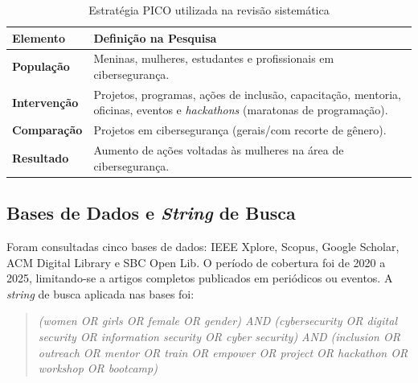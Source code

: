 \documentclass[12pt]{article}
\begin{document}
\begin{table}[H]
\centering
\caption{Estratégia PICO utilizada na revisão sistemática}
\label{tab:pico}
\begin{tabular}{|l|p{9.5cm}|}
    \hline
    \textbf{Elemento} & \textbf{Definição na Pesquisa} \\
    \hline
    \textbf{População} & Meninas, mulheres, estudantes e profissionais em cibersegurança. \\
    \hline
    \textbf{Intervenção} & Projetos, programas, ações de inclusão, capacitação, mentoria, oficinas, eventos e \textit{hackathons} (maratonas de programação). \\
    \hline
    \textbf{Comparação} & Projetos em cibersegurança (gerais/com recorte de gênero). \\
    \hline
    \textbf{Resultado} & Aumento de ações voltadas às mulheres na área de cibersegurança. \\
    \hline
\end{tabular}
\end{table}

\subsection{Bases de Dados e \textit{String} de Busca}\label{subsec:bases}

Foram consultadas cinco bases de dados: IEEE Xplore, Scopus, Google Scholar, ACM Digital Library e SBC Open Lib. O período de cobertura foi de 2020 a 2025, limitando-se a artigos completos publicados em periódicos ou eventos. A \textit{string} de busca aplicada nas bases foi:

\begin{quote}
\small\textit{(\textquotedbl women\textquotedbl{} OR \textquotedbl girls\textquotedbl{}
OR \textquotedbl female\textquotedbl{} OR \textquotedbl gender\textquotedbl{}) AND
(\textquotedbl cybersecurity\textquotedbl{} OR \textquotedbl digital security\textquotedbl{}
OR \textquotedbl information security\textquotedbl{} OR \textquotedbl cyber
security\textquotedbl{}) AND (\textquotedbl inclusion\textquotedbl{} OR
\textquotedbl outreach\textquotedbl{} OR \textquotedbl mentor\textquotedbl{} OR
\textquotedbl train\textquotedbl{} OR \textquotedbl empower\textquotedbl{} OR
\textquotedbl project\textquotedbl{} OR \textquotedbl hackathon\textquotedbl{} OR
\textquotedbl workshop\textquotedbl{} OR \textquotedbl bootcamp\textquotedbl{})}
\end{quote}
\end{document}
